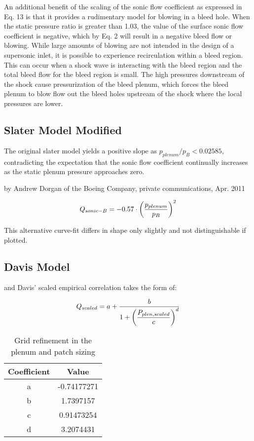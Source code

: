 \documentclass{article}
\begin{document}
An additional benefit of the scaling of the sonic flow coefficient as expressed in Eq. 13 is that it provides a rudimentary model for blowing in a bleed hole. When the static pressure ratio is greater than 1.03, the value of the surface sonic flow coefficient is negative, which by Eq. 2 will result in a negative bleed flow or blowing. While large amounts of blowing are not intended in the design of a supersonic inlet, it is possible to experience recirculation within a bleed region. This can occur when a shock wave is interacting with the bleed region and the total bleed flow for the bleed region is small. The high pressures downstream of the shock cause pressurization of the bleed plenum, which forces the bleed plenum to blow flow out the bleed holes upstream of the shock where the local pressures are lower.



\subsection{Slater Model Modified}

The original slater model yields a positive slope as $p_{plenum}/p_B < 0.02585 $, contradicting the expectation that the sonic flow coefficient continually increases as the static plenum pressure approaches zero.

by Andrew Dorgan of the Boeing Company, private communications, Apr. 2011

$$ Q_{sonic-B} = -0.57 \cdot \qty(\frac{p_{plenum}}{p_B})^2 $$

This alternative curve-fit differs in shape only slightly and not distinguishable if plotted.


\subsection{Davis Model}

and Davis' scaled empirical correlation takes the form of:


$$ Q_{scaled} = a + \dfrac{b}{1+\qty(\dfrac{P_{plen,scaled}}{c})^d} $$

\begin{table}[!htbp] \centering 
\begin{tabular}[c]{*{2}{|c}|} \hline
\textbf{Coefficient} & \textbf{Value}   \\ \hline
a   & -0.74177271 \\ \hline
b   &  1.7397157  \\ \hline
c   &  0.91473254 \\ \hline
d   &  3.2074431  \\ \hline
\end{tabular} 
\caption{Grid refinement in the plenum and patch sizing} 
\label{tab:davis1} \end{table}
\end{document}
